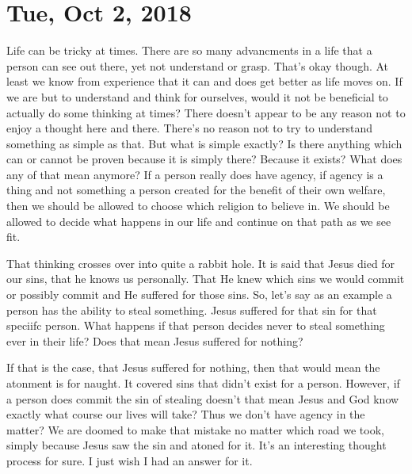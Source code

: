 \section{Tue, Oct 2, 2018}

Life can be tricky at times. There are so many advancments in a life that a person can
see out there, yet not understand or grasp. That's okay though. At least we know from
experience that it can and does get better as life moves on. If we are but to
understand and think for ourselves, would it not be beneficial to actually do some
thinking at times? There doesn't appear to be any reason not to enjoy a thought here
and there. There's no reason not to try to understand something as simple as that.
But what is simple exactly? Is there anything which can or cannot be proven because
it is simply there? Because it exists? What does any of that mean anymore? If a
person really does have agency, if agency is a thing and not something a person
created for the benefit of their own welfare, then we should be allowed to choose
which religion to believe in. We should be allowed to decide what happens in our life
and continue on that path as we see fit.

That thinking crosses over into quite a rabbit hole. It is said that Jesus died for
our sins, that he knows us personally. That He knew which sins we would commit or
possibly commit and He suffered for those sins. So, let's say as an example a person
has the ability to steal something. Jesus suffered for that sin for that speciifc
person. What happens if that person decides never to steal something ever in their
life? Does that mean Jesus suffered for nothing?

If that is the case, that Jesus suffered for nothing, then that would mean the
atonment is for naught. It covered sins that didn't exist for a person. However, if a
person does commit the sin of stealing doesn't that mean Jesus and God know exactly
what course our lives will take? Thus we don't have agency in the matter? We are
doomed to make that mistake no matter which road we took, simply because Jesus saw
the sin and atoned for it. It's an interesting thought process for sure. I just wish
I had an answer for it.
